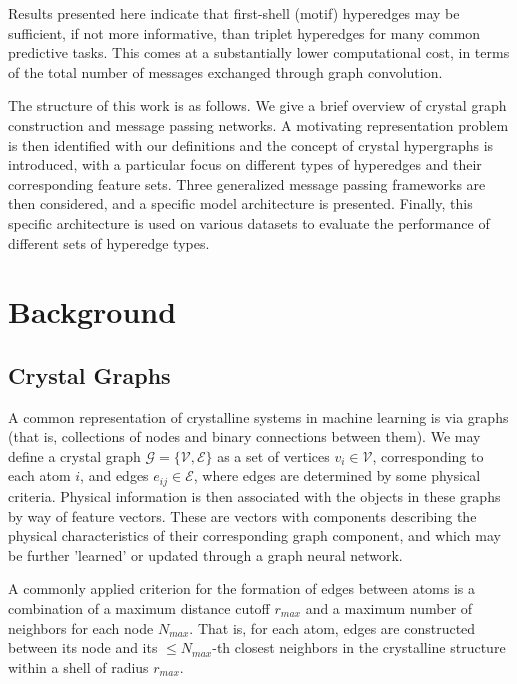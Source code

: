 \documentclass[twoside,twocolumn,9pt]{article}
\begin{document}
Results presented here indicate that first-shell (motif) hyperedges may be sufficient, if not more informative, than triplet hyperedges for many common predictive tasks. This comes at a substantially lower computational cost, in terms of the total number of messages exchanged through graph convolution.

The structure of this work is as follows. We give a brief overview of crystal graph construction and message passing networks. A motivating representation problem is then identified with our definitions and the concept of crystal hypergraphs is introduced, with a particular focus on different types of hyperedges and their corresponding feature sets. Three generalized message passing frameworks are then considered, and a specific model architecture is presented. Finally, this specific architecture is used on various datasets to evaluate the performance of different sets of hyperedge types.

\section{Background}
\subsection{Crystal Graphs}
A common representation of crystalline systems in machine learning is via graphs (that is, collections of nodes and binary connections between them). We may define a crystal graph $\mathcal{G}=\lbrace \mathcal{V},\mathcal{E}\rbrace$ as a set of vertices $v_i\in\mathcal{V}$, corresponding to each atom $i$, and edges $e_{ij}\in\mathcal{E}$, where edges are determined by some physical criteria. Physical information is then associated with the objects in these graphs by way of feature vectors. These are vectors with components describing the physical characteristics of their corresponding graph component, and which may be further 'learned' or updated through a graph neural network.


A commonly applied criterion for the formation of edges between atoms is a combination of a maximum distance cutoff $r_{max}$ and a maximum number of neighbors for each node $N_{max}$. That is, for each atom, edges are constructed between its node and its $\leq N_{max}$-th closest neighbors in the crystalline structure within a shell of radius $r_{max}$.
\end{document}
